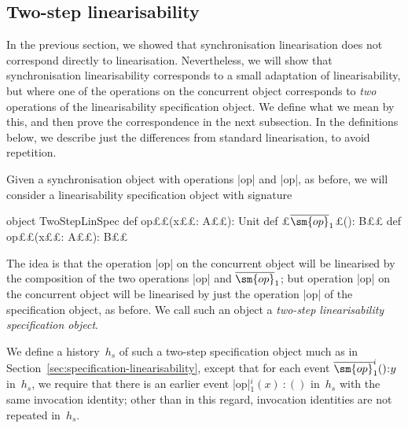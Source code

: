 \subsection{Two-step linearisability}

In the previous section, we showed that synchronisation linearisation does not
correspond directly to linearisation.  Nevertheless, we will show that
synchronisation linearisability corresponds to a small adaptation of
linearisability, but where one of the operations on the concurrent object
corresponds to \emph{two} operations of the linearisability specification
object.  We define what we mean by this, and then prove the correspondence in
the next subsection.  In the definitions below, we describe just the
differences from standard linearisation, to avoid repetition.

Given a synchronisation object with operations |op| and |op|, as before,
we will consider a linearisability specification object with signature
%
\begin{scala}
object TwoStepLinSpec{
  def op££(x££: A££): Unit
  def £$\overline{\sm{op}}_1$£(): B££
  def op££(x££: A££): B££
}
\end{scala}
%
The idea is that the operation |op| on the concurrent object will be
linearised by the composition of the two operations |op| and
$\overline{\sm{op}}_1$; but operation |op| on the concurrent object will be
linearised by just the operation |op| of the specification object, as
before.  We call such an object a \emph{two-step linearisability specification
  object}. 

We define a history~$h_s$ of such a two-step specification object much as in
Section~\ref{sec:specification-linearisability}, except that for each event
$\overline{\sm{op}}_1^i()\::y$ in~$h_s$, we require that there is an
earlier event |op|$_1^i(x)\::()$ in~$h_s$ with the same invocation
identity; other than in this regard, invocation identities are not repeated
in~$h_s$.

